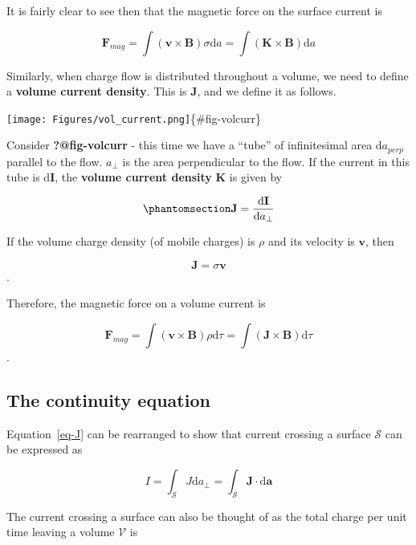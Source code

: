 \documentclass[
  letterpaper,
  DIV=11,
  numbers=noendperiod]{scrreprt}
\begin{document}
It is fairly clear to see then that the magnetic force on the surface
current is

\[ \mathrm{\mathbf{F}}_{mag} = \int  (\mathrm{\mathbf{v}}\times \mathrm{\mathbf{B}}) \sigma \mathrm{d}a = \int  (\mathrm{\mathbf{K}}\times \mathrm{\mathbf{B}}) \mathrm{d}a \]

Similarly, when charge flow is distributed throughout a volume, we need
to define a \textbf{volume current density}. This is
\(\mathrm{\mathbf{J}}\), and we define it as follows.

\texttt{[image: Figures/vol\_current.png]}\{\#fig-volcurr\}

Consider \textbf{?@fig-volcurr} - this time we have a ``tube'' of
infinitesimal area \(\mathrm{d}a_{perp}\) parallel to the flow.
\(a_{\perp}\) is the area perpendicular to the flow. If the current in
this tube is \(\mathrm{d}\mathrm{\mathbf{I}}\), the \textbf{volume
current density} \(\mathrm{\mathbf{K}}\) is given by

\begin{equation}\phantomsection\label{eq-J}{ \mathrm{\mathbf{J}}= \frac{\mathrm{d}\mathrm{\mathbf{I}}}{\mathrm{d}a_{\perp}} }\end{equation}

If the volume charge density (of mobile charges) is \(\rho\) and its
velocity is \(\mathrm{\mathbf{v}}\), then

\[ \mathrm{\mathbf{J}}= \sigma \mathrm{\mathbf{v}}\].

Therefore, the magnetic force on a volume current is

\[ \mathrm{\mathbf{F}}_{mag} = \int  (\mathrm{\mathbf{v}}\times \mathrm{\mathbf{B}}) \rho \mathrm{d}\tau = \int  (\mathrm{\mathbf{J}}\times \mathrm{\mathbf{B}}) \mathrm{d}\tau \].

\subsection{The continuity equation}\label{the-continuity-equation}

Equation~\ref{eq-J} can be rearranged to show that current crossing a
surface \(\mathcal{S}\) can be expressed as

\[ I = \int_{\mathcal{S}} J \mathrm{d}a_{\perp} = \int_{\mathcal{S}} \mathrm{\mathbf{J}}\cdot \mathrm{d}\mathrm{\mathbf{a}}\]

The current crossing a surface can also be thought of as the total
charge per unit time leaving a volume \(\mathcal{V}\) is
\end{document}
